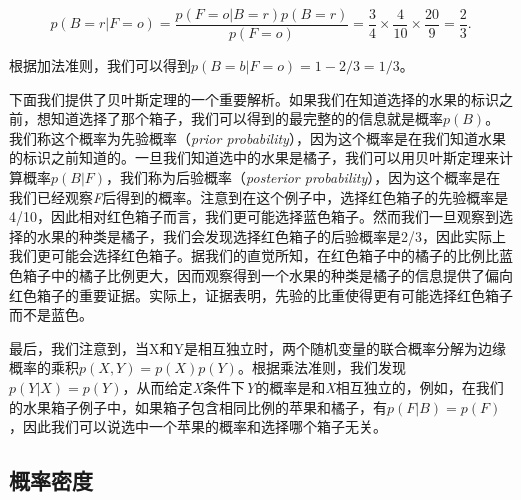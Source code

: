 	\begin{equation}
	p(B = r|F = o) = \frac{p(F = o|B = r)p(B = r)}{p(F = o)} = \frac{3}{4} \times \frac{4}{10} \times \frac{20}{9}= \frac{2}{3}.
	\end{equation}
	
	根据加法准则，我们可以得到$p(B = b|F = o) = 1 -2/3 = 1/3$。
	
	下面我们提供了贝叶斯定理的一个重要解析。如果我们在知道选择的水果的标识之前，想知道选择了那个箱子，我们可以得到的最完整的的信息就是概率$p(B)$。我们称这个概率为先验概率（\textit{prior probability}），因为这个概率是在我们知道水果的标识之前知道的。一旦我们知道选中的水果是橘子，我们可以用贝叶斯定理来计算概率$p(B|F)$，我们称为后验概率（\textit{posterior probability}），因为这个概率是在我们已经观察\textit{F}后得到的概率。注意到在这个例子中，选择红色箱子的先验概率是4/10，因此相对红色箱子而言，我们更可能选择蓝色箱子。然而我们一旦观察到选择的水果的种类是橘子，我们会发现选择红色箱子的后验概率是2/3，因此实际上我们更可能会选择红色箱子。据我们的直觉所知，在红色箱子中的橘子的比例比蓝色箱子中的橘子比例更大，因而观察得到一个水果的种类是橘子的信息提供了偏向红色箱子的重要证据。实际上，证据表明，先验的比重使得更有可能选择红色箱子而不是蓝色。
	
	最后，我们注意到，当X和Y是相互独立时，两个随机变量的联合概率分解为边缘概率的乘积$p(X, Y) = p(X)p(Y)$。根据乘法准则，我们发现$p(Y|X) = p(Y)$，从而给定\textit{X}条件下\textit{Y}的概率是和\textit{X}相互独立的，例如，在我们的水果箱子例子中，如果箱子包含相同比例的苹果和橘子，有$p(F|B) = p(F)$，因此我们可以说选中一个苹果的概率和选择哪个箱子无关。
	
\subsection{概率密度}

	